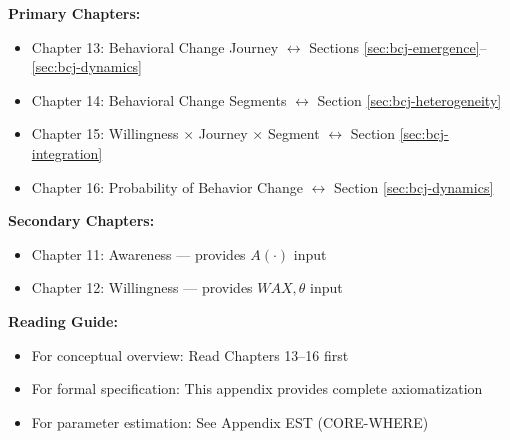 \label{app:bcj}

\begin{tcolorbox}[colback=purple!5!white, colframe=purple!75!black,
    title=Chapter Linkage]

\textbf{Primary Chapters:}
\begin{itemize}[nosep]
\item Chapter 13: Behavioral Change Journey $\leftrightarrow$ Sections \ref{sec:bcj-emergence}--\ref{sec:bcj-dynamics}
\item Chapter 14: Behavioral Change Segments $\leftrightarrow$ Section \ref{sec:bcj-heterogeneity}
\item Chapter 15: Willingness × Journey × Segment $\leftrightarrow$ Section \ref{sec:bcj-integration}
\item Chapter 16: Probability of Behavior Change $\leftrightarrow$ Section \ref{sec:bcj-dynamics}
\end{itemize}

\textbf{Secondary Chapters:}
\begin{itemize}[nosep]
\item Chapter 11: Awareness --- provides $A(\cdot)$ input
\item Chapter 12: Willingness --- provides $WAX, \theta$ input
\end{itemize}

\textbf{Reading Guide:}
\begin{itemize}[nosep]
\item For conceptual overview: Read Chapters 13--16 first
\item For formal specification: This appendix provides complete axiomatization
\item For parameter estimation: See Appendix EST (CORE-WHERE)
\end{itemize}

\end{tcolorbox}

